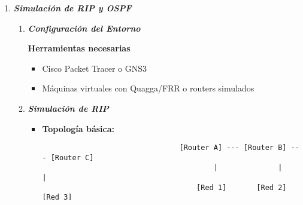 \documentclass[12pt]{amsart}
\begin{document}
\begin{enumerate}
\begin{enumerate}
						\item ¿Y a 10.5.5.5?
						\medskip

						\item ¿Y a 172.16.10.20?
						\medskip

			\end{enumerate}
		
		\bigskip\bigskip

		\item \textbf{\textit{Simulación de RIP y OSPF}}
		
		\medskip\medskip
			\begin{enumerate}
					\bigskip\bigskip

					\item \textbf{\textit{Configuración del Entorno}}
					
					\medskip
					\textbf{Herramientas necesarias}

					\begin{itemize}
						\medskip

						\item Cisco Packet Tracer o GNS3

						\item Máquinas virtuales con Quagga/FRR o routers simulados
					\end{itemize}					

					\bigskip\bigskip

					\item \textbf{\textit{Simulación de RIP}}
					
					\medskip

					\begin{itemize}
						\medskip

						\item \textbf{Topología básica:}

							\begin{verbatim}
								[Router A] --- [Router B] --- [Router C]
									    |              |              |
									[Red 1]       [Red 2]       [Red 3]
							\end{verbatim}


\end{itemize}
\end{enumerate}
\end{enumerate}
\end{document}
